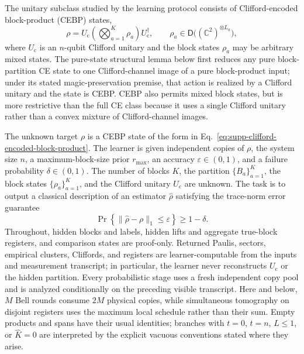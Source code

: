 \documentclass[
  aps,
  prx,
  reprint,
  superscriptaddress,
  amsmath,
  amssymb,
  nofootinbib,
  longbibliography
]{revtex4-2}
\newcommand{\D}{\mathsf{D}}
\begin{document}
The unitary subclass studied by the learning protocol consists of
Clifford-encoded block-product (CEBP) states,
\begin{equation}
\rho
=
U_{\mathrm c}
\left(
\bigotimes_{a=1}^{K}\rho_a
\right)
U_{\mathrm c}^{\dagger},
\qquad
\rho_a\in \D\!\bigl((\mathbb C^2)^{\otimes L_a}\bigr),
\label{eq:supp-clifford-encoded-block-product}
\end{equation}
where $U_{\mathrm c}$ is an $n$-qubit Clifford unitary and the block states
$\rho_a$ may be arbitrary mixed states.  The pure-state structural lemma
below first reduces any pure block-partition CE state to one Clifford-channel
image of a pure block-product input; under its stated magic-preservation
premise, that action is realized by a Clifford unitary and the state is CEBP.
CEBP also permits mixed block states, but is more restrictive than the full CE
class because it uses a single Clifford unitary rather than a convex mixture
of Clifford-channel images.

The unknown target $\rho$ is a CEBP state of the form in
Eq.~\eqref{eq:supp-clifford-encoded-block-product}.  The learner is given
independent copies of $\rho$, the system size $n$, a
maximum-block-size prior $r_{\max}$, an accuracy
$\varepsilon\in(0,1)$, and a failure probability $\delta\in(0,1)$.  The
number of blocks $K$, the partition $\{B_a\}_{a=1}^K$, the block states
$\{\rho_a\}_{a=1}^K$, and the Clifford unitary $U_{\mathrm c}$ are unknown.
The task is to output a classical description of an estimator $\hat\rho$
satisfying the trace-norm error guarantee
\begin{equation}
\Pr\!\left\{\|\hat\rho-\rho\|_1\le\varepsilon\right\}
\ge 1-\delta.
\label{eq:supp-learning-guarantee}
\end{equation}
Throughout, hidden blocks and labels, hidden lifts and aggregate true-block
registers, and comparison states are proof-only.  Returned Paulis, sectors,
empirical clusters, Cliffords, and registers are learner-computable from the
inputs and measurement transcript; in particular, the learner never
reconstructs $U_{\mathrm c}$ or the hidden partition.  Every probabilistic
stage uses a fresh independent copy pool and is analyzed conditionally on the
preceding visible transcript.  Here and below, $M$ Bell rounds consume $2M$
physical copies, while simultaneous tomography on disjoint registers uses the
maximum local schedule rather than their sum.  Empty products and spans have
their usual identities; branches with $t=0$, $t=n$, $L\le1$, or
$\widehat K=0$ are interpreted by the explicit vacuous conventions stated
where they arise.
\end{document}

